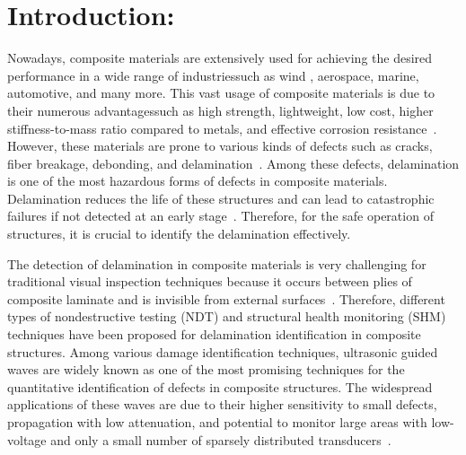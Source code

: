 \section{Introduction:}

Nowadays, composite materials are extensively used for achieving the desired performance in a wide range of industries\DIFaddbegin \DIFadd{, }\DIFaddend such as wind \DIFdelbegin {}\DIFdelend \DIFaddbegin {}\DIFaddend , aerospace, marine, automotive, and many more.
This vast usage of composite materials is due to their numerous advantages\DIFaddbegin \DIFadd{, }\DIFaddend such as high strength, lightweight, low cost, higher stiffness-to-mass ratio compared to metals, and effective corrosion resistance~\cite{giurgiutiu2015structural, stoik2010nondestructive, poudel2015comparison}.
However, these materials are prone to various kinds of defects such as cracks, fiber breakage, debonding, and delamination~\cite{poudel2015comparison, talreja2012damage}.
Among these defects, delamination is one of the most hazardous forms of defects in composite materials. 
Delamination reduces the life of these structures and can lead to catastrophic failures if not detected at an early stage~\cite{talreja2012damage, wisnom2012role}.
Therefore, for the safe operation of structures, it is crucial to identify the delamination effectively.

The detection of delamination in composite materials is very challenging for traditional visual inspection techniques because it occurs between plies of composite laminate and is invisible from external surfaces~\cite{staszewski2009health, tuo2019damage}. 
Therefore, different types of nondestructive testing (NDT) and structural health monitoring (SHM) techniques have been proposed for delamination identification in composite structures.
Among various damage identification techniques, ultrasonic guided waves are widely known as one of the most promising techniques for the quantitative identification of defects in composite structures.
The widespread applications of these waves are due to their higher sensitivity 
to small defects, propagation with low attenuation, and potential to monitor 
large areas with low-voltage and only a small number of sparsely distributed 
transducers~\cite{Barthorpe2020, Ihn2008, Cantero-Chinchilla2020}. 

